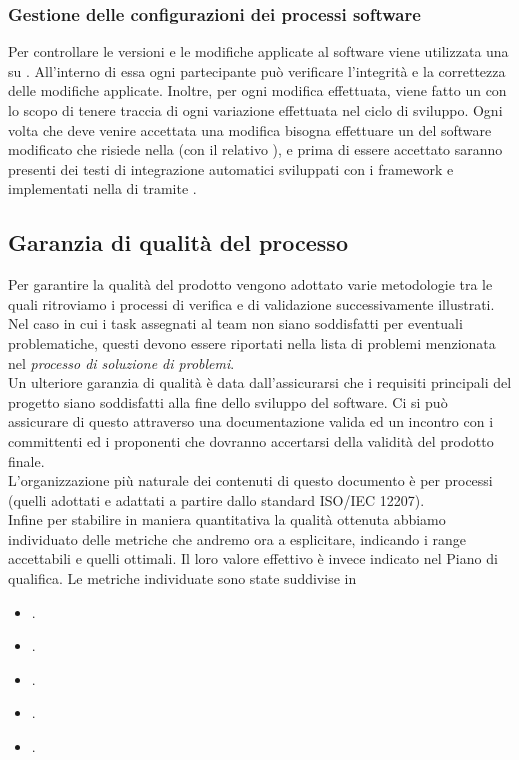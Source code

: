 \subsubsection{Gestione delle configurazioni dei processi software}
Per controllare le versioni e le modifiche applicate al software viene utilizzata una  su . All'interno di essa ogni partecipante può verificare l'integrità e la correttezza delle modifiche applicate. Inoltre, per ogni modifica effettuata, viene fatto un  con lo scopo di tenere traccia di ogni variazione effettuata nel ciclo di sviluppo. Ogni volta che deve venire accettata una modifica bisogna effettuare un 	 del software modificato che risiede nella  (con il relativo ), e prima di essere accettato saranno presenti dei testi di integrazione automatici sviluppati con i framework  e  implementati nella  di  tramite .

\subsection{Garanzia di qualità del processo}
Per garantire la qualità del prodotto vengono adottato varie metodologie tra le quali ritroviamo i processi di verifica e di validazione successivamente illustrati. \\
Nel caso in cui i task assegnati al team non siano soddisfatti per eventuali problematiche, questi devono essere riportati nella lista di problemi menzionata nel \textit{processo di soluzione di problemi}. \\
Un ulteriore garanzia di qualità è data dall'assicurarsi che i requisiti principali del progetto siano soddisfatti alla fine dello sviluppo del software. Ci si può assicurare di questo attraverso una documentazione valida ed un incontro con i committenti ed i proponenti che dovranno accertarsi della validità del prodotto finale. \\
L'organizzazione più naturale dei contenuti di questo documento è per processi (quelli adottati e adattati a partire dallo standard ISO/IEC 12207).\\
Infine per stabilire in maniera quantitativa la qualità ottenuta abbiamo individuato delle metriche che andremo ora a esplicitare, indicando i range accettabili e quelli ottimali. Il loro valore effettivo è invece indicato nel Piano di qualifica.
Le metriche individuate sono state suddivise in
\begin{itemize}
	\item\textbf{}.
	\item\textbf{}.
	\item\textbf{}.
	\item\textbf{}.
	\item\textbf{}.
\end{itemize}

